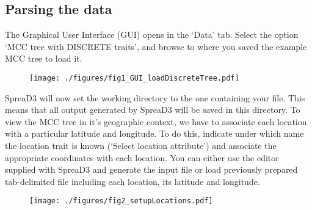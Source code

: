 \documentclass[english]{paper}
\begin{document}

\subsection{Parsing the data}
The Graphical User Interface (GUI) opens in the `Data' tab.
Select the option `MCC tree with DISCRETE traits', and browse to where you saved the example MCC tree to load it.

\begin{figure}[!H]
\centering
\texttt{[image: ./figures/fig1\_GUI\_loadDiscreteTree.pdf]} %
\label{fig:loadData}
\end{figure}

SpreaD3 will now set the working directory to the one containing your file. 
This means that all output generated by SpreaD3 will be saved in this directory.
To view the MCC tree in it's geographic context, we have to associate each location with a particular latitude and longitude. 
To do this, indicate under which name the location trait is known (`Select location attribute') and associate the appropriate coordinates with each location.
You can either use the editor supplied with SpreaD3 and generate the input file or load previously prepared tab-delimited file including each location, its latitude and longitude. 

\begin{figure}[!H]
\centering
\texttt{[image: ./figures/fig2\_setupLocations.pdf]} %
\label{fig:loadData}
\end{figure}
\end{document}
